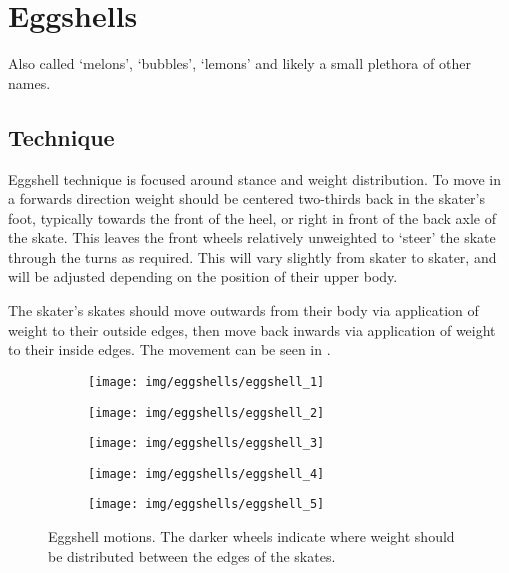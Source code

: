 \section*{Eggshells}
\label{sec:sticky/eggshells}

Also called `melons', `bubbles', `lemons' and likely a small plethora of other names. 


\subsection*{Technique}

Eggshell technique is focused around stance and weight distribution.
To move in a forwards direction weight should be centered two-thirds back in the skater's foot, typically towards the front of the heel, or right in front of the back axle of the skate.  
This leaves the front wheels relatively unweighted to `steer' the skate through the turns as required. 
This will vary slightly from skater to skater, and will be adjusted depending on the position of their upper body. 

The skater's skates should move outwards from their body via application of weight to their outside edges, then move back inwards via application of weight to their inside edges.
The movement can be seen in .

\begin{figure}
\begin{center}
\begin{subfigure}{0.19\linewidth}
\texttt{[image: img/eggshells/eggshell\_1]}
\end{subfigure}
\begin{subfigure}{0.19\linewidth}
\texttt{[image: img/eggshells/eggshell\_2]}
\end{subfigure}
\begin{subfigure}{0.19\linewidth}
\texttt{[image: img/eggshells/eggshell\_3]}
\end{subfigure}
\begin{subfigure}{0.19\linewidth}
\texttt{[image: img/eggshells/eggshell\_4]}
\end{subfigure}
\begin{subfigure}{0.19\linewidth}
\texttt{[image: img/eggshells/eggshell\_5]}
\end{subfigure}
\caption{Eggshell motions. The darker wheels indicate where weight should be distributed between the edges of the skates. 
\label{fig:sticky/eggshells}
}
\end{center}
\end{figure}


